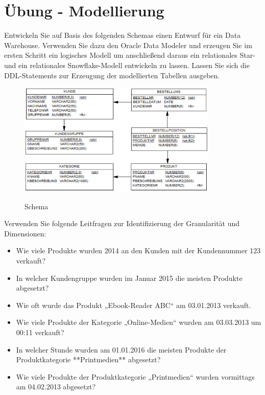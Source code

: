 \section{Übung - Modellierung}
\label{sec:uebung_03}
Entwickeln Sie auf Basis des folgenden Schemas einen Entwurf für ein Data Warehouse. Verwenden Sie dazu den Oracle Data Modeler und erzeugen Sie im ersten Schritt ein logisches Modell um anschließend daraus ein relationales Star- und ein relationales Snowflake-Modell entwickeln zu lassen. Lassen Sie sich die DDL-Statements zur Erzeugung der modellierten Tabellen ausgeben.

\begin{figure}[H]
  \centering
  \includegraphics[width=0.85\textwidth]{img//uebung_03_-_schema.png}
  \label{img:uebung_03_-_schema}
  \caption{Schema}
\end{figure} 

Verwenden Sie folgende Leitfragen zur Identifizierung der Granularität und Dimensionen:
\begin{itemize}
  \item Wie viele Produkte wurden 2014 an den Kunden mit der Kundennummer 123 verkauft?
  \item In welcher Kundengruppe wurden im Januar 2015 die meisten Produkte abgesetzt?
  \item Wie oft wurde das Produkt „Ebook-Reader ABC“ am 03.01.2013 verkauft.
  \item Wie viele Produkte der Kategorie „Online-Medien“ wurden am 03.03.2013 um 00:11 verkauft?
  \item In welcher Stunde wurden am 01.01.2016 die meisten Produkte der Produktkategorie **Printmedien** abgesetzt?
  \item Wie viele Produkte der Produktkategorie „Printmedien“ wurden vormittags am 04.02.2013 abgesetzt?
\end{itemize}
